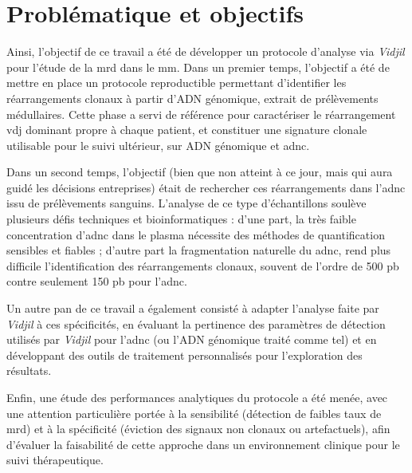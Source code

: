 \chapter{Problématique et objectifs}

Ainsi, l'objectif de ce travail a été de développer un protocole d'analyse via \textit{Vidjil} 
pour l'étude de la \gls{mrd} dans le \gls{mm}. Dans un premier temps, l'objectif a été 
de mettre en place un protocole reproductible permettant d'identifier les réarrangements clonaux 
à partir d'ADN génomique, extrait de prélèvements médullaires. Cette phase a servi de référence 
pour caractériser le réarrangement \gls{vdj} dominant propre à chaque patient, et constituer une 
signature clonale utilisable pour le suivi ultérieur, sur ADN génomique et \gls{adnc}.

\vspace{1em}

Dans un second temps, l'objectif (bien que non atteint à ce jour, mais qui aura guidé les décisions entreprises) 
était de rechercher ces réarrangements dans l'\gls{adnc} issu de prélèvements sanguins. L'analyse de ce type d'échantillons 
soulève plusieurs défis techniques et bioinformatiques : d'une part, la très faible concentration d'\gls{adnc} dans le 
plasma nécessite des méthodes de quantification sensibles et fiables ; d'autre part la fragmentation naturelle du \gls{adnc}, 
rend plus difficile l'identification des réarrangements clonaux, souvent de l'ordre de 500 pb contre seulement 150 pb pour l'\gls{adnc}. 

\vspace{1em}

Un autre pan de ce travail a également consisté à adapter l'analyse faite par \textit{Vidjil} à ces spécificités, 
en évaluant la pertinence des paramètres de détection utilisés par \textit{Vidjil} pour l'\gls{adnc} (ou l'ADN génomique 
traité comme tel) et en développant des outils de traitement personnalisés pour l'exploration des résultats. 

\vspace{1em}

Enfin, une étude des performances analytiques du protocole a été menée, avec une attention particulière portée à la 
sensibilité (détection de faibles taux de \gls{mrd}) et à la spécificité (éviction des signaux non clonaux ou artefactuels), 
afin d'évaluer la faisabilité de cette approche dans un environnement clinique pour le suivi thérapeutique.


